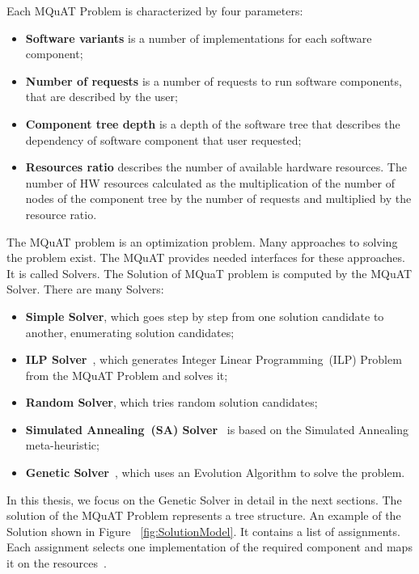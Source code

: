 Each MQuAT Problem is characterized by four parameters:

\begin{itemize}
	\item \textbf{Software variants} is a number of implementations for each software component;
	\item \textbf{Number of requests} is a number of requests to run software components, that are described by the user;
	\item \textbf{Component tree depth} is a depth of the software tree that describes the dependency of software component that user requested;
	\item \textbf{Resources ratio} describes the number of available hardware resources. The number of HW resources calculated as the multiplication of the number of nodes of the component tree by the number of requests and multiplied by the resource ratio.
\end{itemize}

The MQuAT problem is an optimization problem. Many approaches to solving the problem exist. The MQuAT provides needed interfaces for these approaches. It is called Solvers.
The Solution of MQuaT problem is computed by the MQuAT Solver. There are many Solvers:

\begin{itemize}
	\item \textbf{Simple Solver}, which goes step by step from one solution candidate to another, enumerating solution candidates;
	\item \textbf{ILP Solver}~\cite{gotz18}, which generates Integer Linear Programming~(ILP) Problem from the MQuAT Problem and solves it;
	\item \textbf{Random Solver}, which tries random solution candidates;
	\item \textbf{Simulated Annealing~(SA) Solver}~\cite{pukhkaiev19} is based on the Simulated Annealing meta-heuristic;
	\item \textbf{Genetic Solver}~\cite{ahmad18}, which uses an Evolution Algorithm to solve the problem.
\end{itemize}

In this thesis, we focus on the Genetic Solver in detail in the next sections. The solution of the MQuAT Problem represents a tree structure. An example of the Solution shown in Figure ~\ref{fig:SolutionModel}. It contains a list of assignments. Each assignment selects one implementation of the required component and maps it on the resources~\cite{gotz18}.


